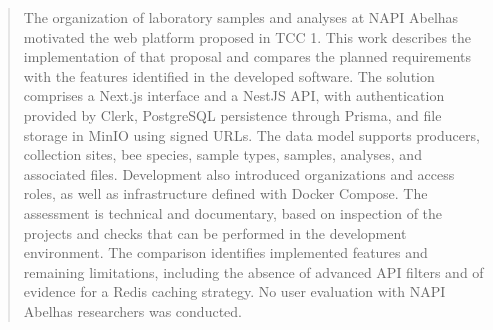 \documentclass[openright]{normas-utf-tex} %
\begin{document}
\begin{abstract}
The organization of laboratory samples and analyses at NAPI Abelhas motivated the web platform proposed in TCC 1. This work describes the implementation of that proposal and compares the planned requirements with the features identified in the developed software. The solution comprises a Next.js interface and a NestJS API, with authentication provided by Clerk, PostgreSQL persistence through Prisma, and file storage in MinIO using signed URLs. The data model supports producers, collection sites, bee species, sample types, samples, analyses, and associated files. Development also introduced organizations and access roles, as well as infrastructure defined with Docker Compose. The assessment is technical and documentary, based on inspection of the projects and checks that can be performed in the development environment. The comparison identifies implemented features and remaining limitations, including the absence of advanced API filters and of evidence for a Redis caching strategy. No user evaluation with NAPI Abelhas researchers was conducted.
\end{abstract}

\listadefiguras %
\listadetabelas %
\listadesiglas %

\sumario %









\clearpage %
\label{bibstart}
\label{bibend}


\end{document}
